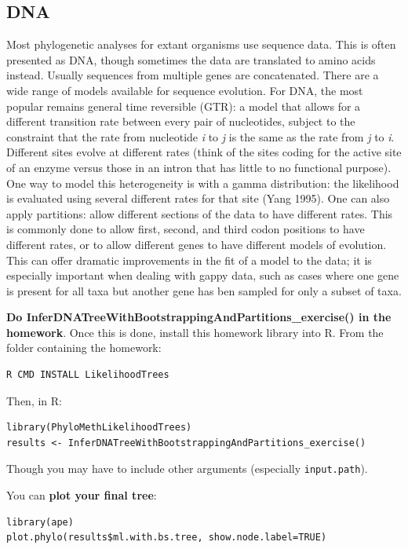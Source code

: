 \documentclass[
]{article}
\begin{document}
\hypertarget{dna}{%
\subsection{DNA}\label{dna}}

Most phylogenetic analyses for extant organisms use sequence data. This is often presented as DNA, though sometimes the data are translated to amino acids instead. Usually sequences from multiple genes are concatenated. There are a wide range of models available for sequence evolution. For DNA, the most popular remains general time reversible (GTR): a model that allows for a different transition rate between every pair of nucleotides, subject to the constraint that the rate from nucleotide \emph{i} to \emph{j} is the same as the rate from \emph{j} to \emph{i}. Different sites evolve at different rates (think of the sites coding for the active site of an enzyme versus those in an intron that has little to no functional purpose). One way to model this heterogeneity is with a gamma distribution: the likelihood is evaluated using several different rates for that site (Yang 1995). One can also apply partitions: allow different sections of the data to have different rates. This is commonly done to allow first, second, and third codon positions to have different rates, or to allow different genes to have different models of evolution. This can offer dramatic improvements in the fit of a model to the data; it is especially important when dealing with gappy data, such as cases where one gene is present for all taxa but another gene has ben sampled for only a subset of taxa.

\textbf{Do InferDNATreeWithBootstrappingAndPartitions\_exercise() in the homework}. Once this is done, install this homework library into R. From the folder containing the homework:

\begin{verbatim}
R CMD INSTALL LikelihoodTrees
\end{verbatim}

Then, in R:

\begin{verbatim}
library(PhyloMethLikelihoodTrees)
results <- InferDNATreeWithBootstrappingAndPartitions_exercise()
\end{verbatim}

Though you may have to include other arguments (especially \texttt{input.path}).

You can \textbf{plot your final tree}:

\begin{verbatim}
library(ape)
plot.phylo(results$ml.with.bs.tree, show.node.label=TRUE)
\end{verbatim}
\end{document}
